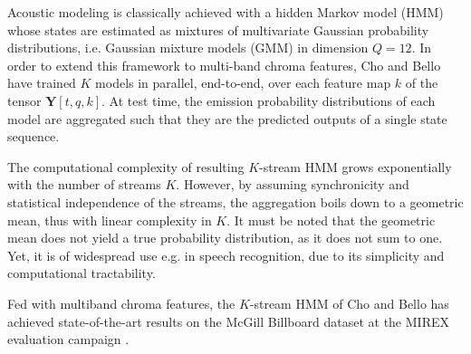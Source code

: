 \documentclass{article}
\makeatletter
\newcommand*{\eg}{e.g.\@\xspace}
\newcommand*{\ie}{i.e.\@\xspace}
\makeatother
\begin{document}
Acoustic modeling is classically achieved with a hidden Markov model (HMM)
whose states are estimated as mixtures of multivariate Gaussian probability
distributions, \ie Gaussian mixture models (GMM) in dimension $Q=12$.
In order to extend this framework to multi-band chroma features, Cho and Bello
have trained $K$ models in parallel, end-to-end, over each feature map $k$
of the tensor $\mathbf{Y}[t, q, k]$.
At test time, the emission probability distributions of each model
are aggregated such that they are the predicted outputs of a single state sequence.

The computational complexity of resulting $K$-stream HMM grows exponentially
with the number of streams $K$.
However, by assuming synchronicity and statistical independence of the streams,
the aggregation boils down to a geometric mean, thus with linear complexity in $K$.
It must be noted that the geometric mean does not yield a true probability distribution, as
it does not sum to one.
Yet, it is of widespread use \eg in speech recognition, due to its simplicity and computational
tractability.

Fed with multiband chroma features, the $K$-stream HMM of Cho and Bello
has achieved state-of-the-art results on the McGill Billboard dataset at the
MIREX evaluation campaign \cite{cho2013mirex}.

\end{document}
